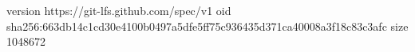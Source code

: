 version https://git-lfs.github.com/spec/v1
oid sha256:663db14c1cd30e4100b0497a5dfe5ff75c936435d371ca40008a3f18c83c3afc
size 1048672
